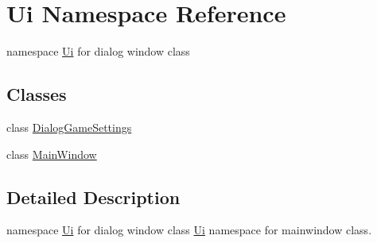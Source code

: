 \hypertarget{namespace_ui}{\section{Ui Namespace Reference}
\label{namespace_ui}
}


namespace \hyperlink{namespace_ui}{Ui} for dialog window class  


\subsection*{Classes}
\begin{DoxyCompactItemize}
\item 
class \hyperlink{class_ui_1_1_dialog_game_settings}{Dialog\-Game\-Settings}
\item 
class \hyperlink{class_ui_1_1_main_window}{Main\-Window}
\end{DoxyCompactItemize}


\subsection{Detailed Description}
namespace \hyperlink{namespace_ui}{Ui} for dialog window class \hyperlink{namespace_ui}{Ui} namespace for mainwindow class. 